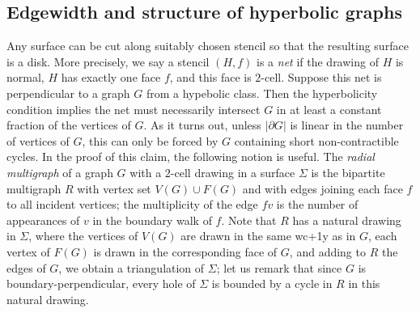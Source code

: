 \documentclass[12pt,twoside,openright,a4paper]{book}
\begin{document}
\subsection{Edgewidth and structure of hyperbolic graphs}

Any surface can be cut along suitably chosen stencil so that the resulting surface is a disk.
More precisely, we say a stencil $(H,f)$ is a \emph{net} if the drawing of $H$ is normal, $H$ has exactly one face $f$,
and this face is $2$-cell.  Suppose this net is perpendicular to a graph $G$ from a hypebolic class.  Then the hyperbolicity
condition implies the net must necessarily intersect $G$ in at least a constant fraction of the vertices
of $G$.  As it turns out, unless $|\partial G|$ is linear in the number of vertices of $G$,
this can only be forced by $G$ containing short non-contractible cycles.  In the proof of this claim,
the following notion is useful.  The \emph{radial multigraph} of a graph $G$ with a $2$-cell drawing in a surface $\Sigma$ is
the bipartite multigraph $R$ with vertex set $V(G)\cup F(G)$ and with edges joining each face $f$ to all incident vertices;
the multiplicity of the edge $fv$ is the number of appearances of $v$ in the boundary walk of $f$.
Note that $R$ has a natural drawing in $\Sigma$, where the vertices of $V(G)$ are drawn in the same wc+1y
as in $G$, each vertex of $F(G)$ is drawn in the corresponding face of $G$, and adding to $R$ the edges of $G$,
we obtain a triangulation of $\Sigma$; let us remark that since $G$ is boundary-perpendicular, every hole
of $\Sigma$ is bounded by a cycle in $R$ in this natural drawing.
\end{document}
